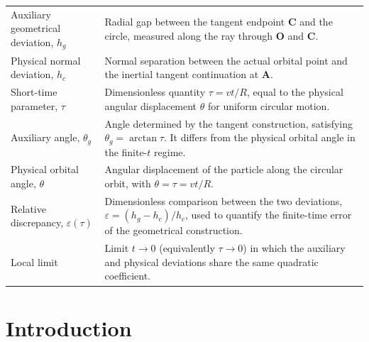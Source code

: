 \documentclass[preprint,12pt,3p,nopreprintline]{elsarticle}
\newcommand{\pt}[1]{\mathbf{#1}}
\numberwithin{equation}{section}
\theoremstyle{remark}
\begin{document}
\begin{tabularx}{\textwidth}{@{}>{\raggedright\arraybackslash}p{}X@{}}
Auxiliary geometrical deviation, $h_g$ &
Radial gap between the tangent endpoint $\pt{C}$ and the circle, measured along the ray through $\pt{O}$ and $\pt{C}$. \\

Physical normal deviation, $h_c$ &
Normal separation between the actual orbital point and the inertial tangent continuation at $\pt{A}$. \\

Short-time parameter, $\tau$ &
Dimensionless quantity $\tau=vt/R$, equal to the physical angular displacement $\theta$ for uniform circular motion. \\

Auxiliary angle, $\theta_g$ &
Angle determined by the tangent construction, satisfying $\theta_g=\arctan\tau$. It differs from the physical orbital angle in the finite-$t$ regime. \\

Physical orbital angle, $\theta$ &
Angular displacement of the particle along the circular orbit, with $\theta=\tau=vt/R$. \\

Relative discrepancy, $\varepsilon(\tau)$ &
Dimensionless comparison between the two deviations, $\varepsilon=(h_g-h_c)/h_c$, used to quantify the finite-time error of the geometrical construction. \\

Local limit &
Limit $t\to0$ (equivalently $\tau\to0$) in which the auxiliary and physical deviations share the same quadratic coefficient. \\

\bottomrule
\end{tabularx}

\clearpage
\thispagestyle{plain}

\section{Introduction}
\end{document}
